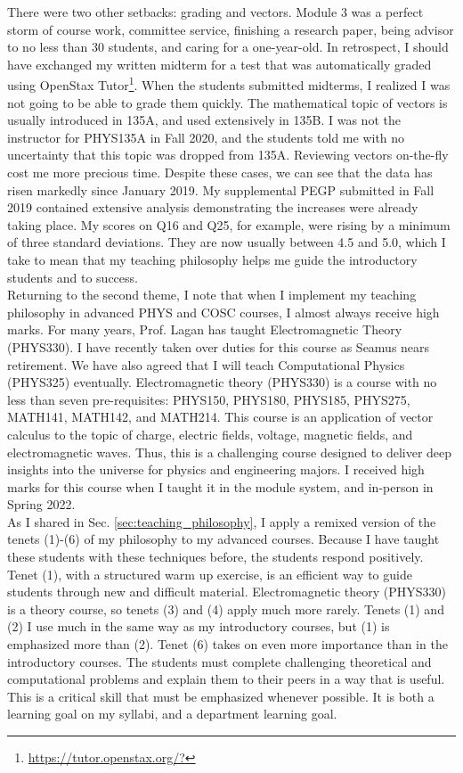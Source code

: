 \documentclass[../../../main.tex]{subfiles}
\begin{document}
There were two other setbacks: grading and vectors.  Module 3 was a perfect storm of course work, committee service, finishing a research paper, being advisor to no less than 30 students, and caring for a one-year-old. In retrospect, I should have exchanged my written midterm for a test that was automatically graded using OpenStax Tutor\footnote{\url{https://tutor.openstax.org/?}}.  When the students submitted midterms, I realized I was not going to be able to grade them quickly.  The mathematical topic of vectors is usually introduced in 135A, and used extensively in 135B.  I was not the instructor for PHYS135A in Fall 2020, and the students told me with no uncertainty that this topic was dropped from 135A.  Reviewing vectors on-the-fly cost me more precious time.  Despite these cases, we can see that the data has risen markedly since January 2019.  My supplemental PEGP submitted in Fall 2019 contained extensive analysis demonstrating the increases were already taking place.  My scores on Q16 and Q25, for example, were rising by a minimum of three standard deviations.  They are now usually between 4.5 and 5.0, which I take to mean that my teaching philosophy helps me guide the introductory students and to success.
\\
\vspace{0.15cm}
Returning to the second theme, I note that when I implement my teaching philosophy in advanced PHYS and COSC courses, I almost always receive high marks.  For many years, Prof. Lagan has taught Electromagnetic Theory (PHYS330).  I have recently taken over duties for this course as Seamus nears retirement.  We have also agreed that I will teach Computational Physics (PHYS325) eventually.  Electromagnetic theory (PHYS330) is a course with no less than seven pre-requisites: PHYS150, PHYS180, PHYS185, PHYS275, MATH141, MATH142, and MATH214.  This course is an application of vector calculus to the topic of charge, electric fields, voltage, magnetic fields, and electromagnetic waves.  Thus, this is a challenging course designed to deliver deep insights into the universe for physics and engineering majors.  I received high marks for this course when I taught it in the module system, and in-person in Spring 2022.
\\
\vspace{0.15cm}
As I shared in Sec. \ref{sec:teaching_philosophy}, I apply a remixed version of the tenets (1)-(6) of my philosophy to my advanced courses.  Because I have taught these students with these techniques before, the students respond positively. Tenet (1), with a structured warm up exercise, is an efficient way to guide students through new and difficult material. Electromagnetic theory (PHYS330) is a theory course, so tenets (3) and (4) apply much more rarely.  Tenets (1) and (2) I use much in the same way as my introductory courses, but (1) is emphasized more than (2).  Tenet (6) takes on even more importance than in the introductory courses.  The students must complete challenging theoretical and computational problems and explain them to their peers in a way that is useful.  This is a critical skill that must be emphasized whenever possible.  It is both a learning goal on my syllabi, and a department learning goal.
\end{document}
